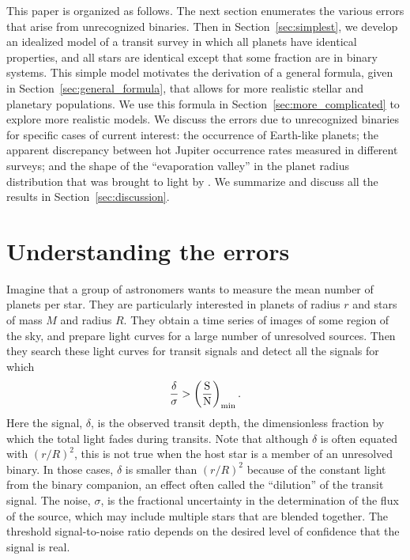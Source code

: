 \documentclass[12pt,modern]{aastex61}
\begin{document}
This paper is organized as follows.  The next section enumerates the
various errors that arise from unrecognized binaries.  Then in
Section~\ref{sec:simplest}, we develop an idealized model of a transit
survey in which all planets have identical properties, and all stars
are identical except that some fraction are in binary systems.  This
simple model motivates the derivation of a general formula, given in
Section~\ref{sec:general_formula}, that allows for more realistic
stellar and planetary populations.  We use this formula in
Section~\ref{sec:more_complicated} to explore more realistic models.
We discuss the errors due to unrecognized binaries for specific cases
of current interest: the occurrence of Earth-like planets; the
apparent discrepancy between hot Jupiter occurrence rates measured in
different surveys; and the shape of the ``evaporation valley'' in the
planet radius distribution that was brought to light by
\citet{fulton_california-_2017}.  We summarize and discuss all the
results in Section~\ref{sec:discussion}.


\section{Understanding the errors}
\label{sec:concept}

Imagine that a group of astronomers wants to measure the mean number
of planets per star.  They are particularly interested in planets of
radius $r$ and stars of mass $M$ and radius $R$.  They obtain a time
series of images of some region of the sky, and prepare light curves
for a large number of unresolved sources.  Then they search these
light curves for transit signals and detect all the signals for which
\begin{equation}
  \frac{\delta}{\sigma}
  >
  \left(\frac{{\rm S}}{{\rm N}}\right)_{\rm min}.
\label{eq:S_N_thresh}
\end{equation}
Here the signal, $\delta$, is the observed transit depth, the
dimensionless fraction by which the total light fades during transits.
Note that although $\delta$ is often equated with $(r/R)^2$, this is
not true when the host star is a member of an unresolved binary.  In
those cases, $\delta$ is smaller than $(r/R)^2$ because of the
constant light from the binary companion, an effect often called the
``dilution'' of the transit signal.  The noise, $\sigma$, is the
fractional uncertainty in the determination of the flux of the source,
which may include multiple stars that are blended together.  The
threshold signal-to-noise ratio depends on the desired level of
confidence that the signal is real.
\end{document}
